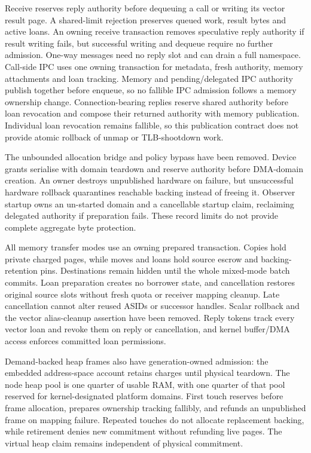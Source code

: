 Receive reserves reply authority before dequeuing a call or writing its vector
result page. A shared-limit rejection preserves queued work, result bytes and
active loans. An owning receive transaction removes speculative reply authority
if result writing fails, but successful writing and dequeue require no further
admission. One-way messages need no reply slot and can drain a full namespace.
Call-side IPC uses one owning transaction for metadata, fresh authority, memory
attachments and loan tracking. Memory and pending/delegated IPC authority
publish together before enqueue, so no fallible IPC admission follows a memory
ownership change. Connection-bearing replies reserve shared authority before
loan revocation and compose their returned authority with memory publication.
Individual loan revocation remains fallible, so this publication contract does
not provide atomic rollback of unmap or TLB-shootdown work.

The unbounded allocation bridge and policy bypass have been removed. Device
grants serialise with domain teardown and reserve authority before DMA-domain
creation. An owner destroys unpublished hardware on failure, but unsuccessful
hardware rollback quarantines reachable backing instead of freeing it.
Observer startup owns an un-started domain and a cancellable startup claim,
reclaiming delegated authority if preparation fails. These record limits do
not provide complete aggregate byte protection.

All memory transfer modes use an owning prepared
transaction. Copies hold private charged pages, while moves and loans hold source
escrow and backing-retention pins. Destinations remain hidden until the whole
mixed-mode batch commits. Loan preparation creates no borrower state, and
cancellation restores original source slots without fresh quota or receiver
mapping cleanup. Late cancellation cannot alter reused ASIDs or successor
handles. Scalar rollback and the vector alias-cleanup assertion have been
removed. Reply tokens track every vector loan and revoke them on reply or
cancellation, and kernel buffer/DMA access enforces committed loan permissions.

Demand-backed heap frames also have generation-owned admission: the embedded
address-space account retains charges until physical teardown. The node heap
pool is one quarter of usable RAM, with one quarter of that pool reserved for
kernel-designated platform domains. First touch reserves before frame
allocation, prepares ownership tracking fallibly, and refunds an unpublished
frame on mapping failure. Repeated touches do not allocate replacement backing, while
retirement denies new commitment without refunding live pages.
The virtual heap claim remains independent of physical commitment.

